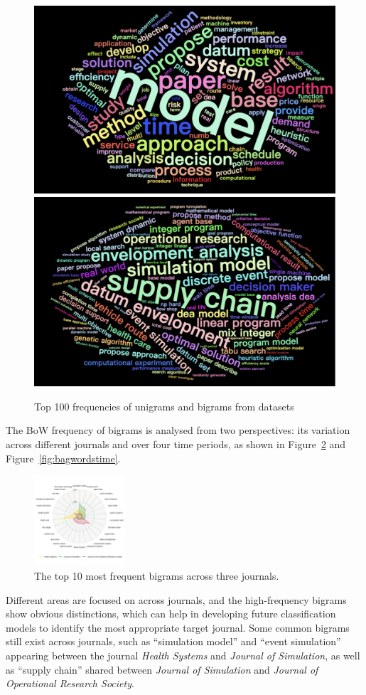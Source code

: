 \documentclass[9pt,twocolumn,twoside]{pnas-new}
\begin{document}
\begin{figure}[!tbhp]
\centering
\includegraphics[width=0.4\linewidth]{bag_words/unigrams.png}
\includegraphics[width=0.4\linewidth]{bag_words/bigrams.png}
\caption{Top 100 frequencies of unigrams and bigrams from datasets}
\label{fig:bagwords}
\end{figure}
 
The BoW frequency of bigrams is analysed from two perspectives: its variation across different journals and over four time periods, as shown in Figure~\ref{fig:bagwordsjournal} and Figure~\ref{fig:bagwordstime}.

\begin{figure}[!tbhp]
\centering
\includegraphics[width=0.3\textwidth]{bag_words/radar_journal.png}

\caption{The top 10 most frequent bigrams across three journals.}
\label{fig:bagwordsjournal}
\end{figure}

Different areas are focused on across journals, and the high-frequency bigrams show obvious distinctions, which can help in developing future classification models to identify the most appropriate target journal. Some common bigrams still exist across journals, such as ``simulation model'' and ``event simulation'' appearing between the journal \textit{Health Systems} and \textit{Journal of Simulation}, as well as ``supply chain'' shared between \textit{Journal of Simulation} and \textit{Journal of Operational Research Society}.
\end{document}
